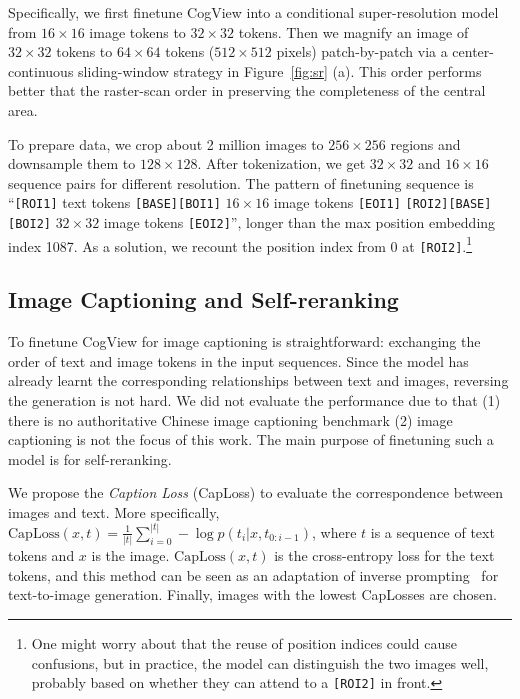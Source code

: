 Specifically, we first finetune CogView into a conditional super-resolution model from $16\times 16$ image tokens to $32\times 32$ tokens. Then we magnify an image of $32\times 32$ tokens to $64\times 64$ tokens ($512\times 512$ pixels) patch-by-patch via a center-continuous sliding-window strategy in Figure~\ref{fig:sr} (a). This order performs better that the raster-scan order in preserving the completeness of the central area.

To prepare data, we crop about 2 million images to $256\times 256$ regions and downsample them to $128\times 128$. After tokenization, we get $32\times 32$ and $16\times 16$ sequence pairs for different resolution. The pattern of finetuning sequence is ``\texttt{[ROI1]} text tokens \texttt{[BASE]}\texttt{[BOI1]} $16\times 16$ image tokens \texttt{[EOI1]} \texttt{[ROI2]}\texttt{[BASE]} \texttt{[BOI2]} $32\times 32$ image tokens \texttt{[EOI2]}'', longer than the max position embedding index 1087. As a solution, we recount the position index from 0 at \texttt{[ROI2]}.\footnote{One might worry about that the reuse of position indices could cause confusions, but in practice, the model can distinguish the two images well, probably based on whether they can attend to a \texttt{[ROI2]} in front.} 

\subsection{Image Captioning and Self-reranking} To finetune CogView for image captioning is straightforward: exchanging the order of text and image tokens in the input sequences. Since the model has already learnt the corresponding relationships between text and images, reversing the generation is not hard. We did not evaluate the performance due to that (1) there is no authoritative Chinese image captioning benchmark (2) image captioning is not the focus of this work. The main purpose of finetuning such a model is for self-reranking. 

We propose the \emph{Caption Loss} (CapLoss) to evaluate the correspondence between images and text. More specifically, $\text{CapLoss}(x,t)=\frac{1}{|t|}{\sum_{i=0}^{|t|}-\log p(t_i|x, t_{0:i-1})} $, where $t$ is a sequence of text tokens and $x$ is the image. $\text{CapLoss}(x,t)$ is the cross-entropy loss for the text tokens, and this method can be seen as an adaptation of inverse prompting~\cite{zou2021controllable} for text-to-image generation. Finally, images with the lowest CapLosses are chosen.

